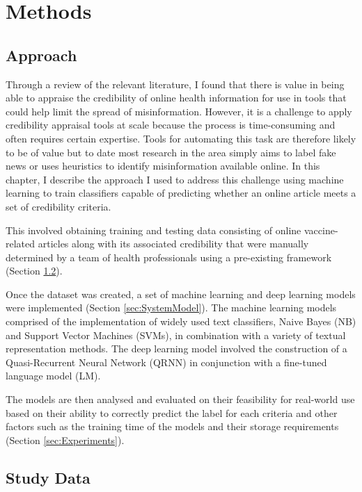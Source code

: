 \documentclass[a4paper,twoside,phd]{BYUPhys}
\begin{document}
\chapter{Methods}
\label{chap:Methods}

\section{Approach}
\label{sec:Approach}

Through a review of the relevant literature, I found that there is value in being able to appraise the credibility of online health information for use in tools that could help limit the spread of misinformation. However, it is a challenge to apply credibility appraisal tools at scale because the process is time-consuming and often requires certain expertise. Tools for automating this task are therefore likely to be of value but to date most research in the area simply aims to label fake news or uses heuristics to identify misinformation available online. In this chapter, I describe the approach I used to address this challenge using machine learning to train classifiers capable of predicting whether an online article meets a set of credibility criteria.\newline

This involved obtaining training and testing data consisting of online vaccine-related articles along with its associated credibility that were manually determined by a team of health professionals using a pre-existing framework (Section \ref{sec:StudyData}). \newline

Once the dataset was created, a set of machine learning and deep learning models were implemented (Section \ref{sec:SystemModel}). The machine learning models comprised of the implementation of widely used text classifiers, Naive Bayes (NB) and Support Vector Machines (SVMs), in combination with a variety of textual representation methods. The deep learning model involved the construction of a Quasi-Recurrent Neural Network (QRNN) in conjunction with a fine-tuned language model (LM). \newline

The models are then analysed and evaluated on their feasibility for real-world use based on their ability to correctly predict the label for each criteria and other factors such as the training time of the models and their storage requirements (Section \ref{sec:Experiments}).

\section{Study Data}
\label{sec:StudyData}
\end{document}
